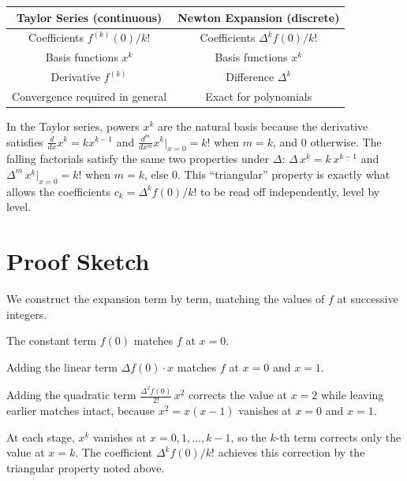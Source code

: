 \begin{center}
\renewcommand{\arraystretch}{1.5}
\begin{tabular}{|c|c|}
\hline
\textbf{Taylor Series (continuous)} & \textbf{Newton Expansion (discrete)} \\
\hline
Coefficients \(f^{(k)}(0)/k!\) & Coefficients \(\Delta^k f(0)/k!\) \\
Basis functions \(x^k\) & Basis functions \(x^{\underline{k}}\) \\
Derivative \(f^{(k)}\) & Difference \(\Delta^k\) \\
Convergence required in general & Exact for polynomials \\
\hline
\end{tabular}
\end{center}

\begin{remark*}
In the Taylor series, powers \(x^k\) are the natural basis because
the derivative satisfies \(\tfrac{d}{dx}x^k = kx^{k-1}\) and
\(\tfrac{d^m}{dx^m}x^k\big|_{x=0} = k!\) when \(m=k\), and \(0\) otherwise.
The falling factorials satisfy the same two properties under \(\Delta\):
\(\Delta\,x^{\underline{k}} = k\,x^{\underline{k-1}}\) and
\(\Delta^m\,x^{\underline{k}}\big|_{x=0} = k!\) when \(m=k\), else \(0\).
This ``triangular'' property is exactly what allows the coefficients
\(c_k = \Delta^k f(0)/k!\) to be read off independently, level by level.
\end{remark*}

\section*{Proof Sketch}

We construct the expansion term by term, matching the values of \(f\) at
successive integers.

The constant term \(f(0)\) matches \(f\) at \(x = 0\).

Adding the linear term \(\Delta f(0)\cdot x\) matches \(f\) at \(x = 0\)
and \(x = 1\).

Adding the quadratic term \(\tfrac{\Delta^2 f(0)}{2!}\,x^{\underline{2}}\)
corrects the value at \(x = 2\) while leaving earlier matches intact,
because \(x^{\underline{2}} = x(x-1)\) vanishes at \(x = 0\) and \(x = 1\).

At each stage, \(x^{\underline{k}}\) vanishes at \(x = 0, 1, \dots, k-1\),
so the \(k\)-th term corrects only the value at \(x = k\). The coefficient
\(\Delta^k f(0)/k!\) achieves this correction by the triangular property
noted above.

